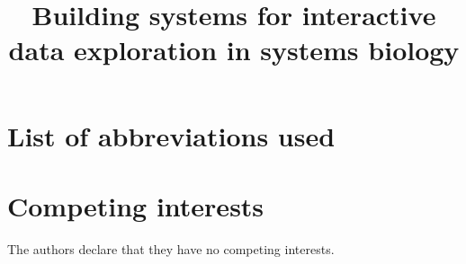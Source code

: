 \documentclass[twocolumn]{bmcart}%
\begin{document}
\begin{frontmatter}
\begin{fmbox}

\title{Building systems for interactive data exploration in systems biology}

 

\begin{artnotes}
\end{artnotes}
\end{fmbox}%

 
\end{frontmatter}

 

\begin{backmatter}

\section*{List of abbreviations used}
\section*{Competing interests}
The authors declare that they have no competing interests.
\end{backmatter}
\end{document}

